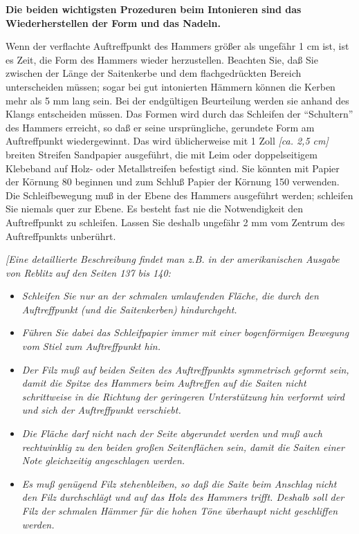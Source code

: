 \textbf{Die beiden wichtigsten Prozeduren beim Intonieren sind das Wiederherstellen der Form und das Nadeln.}

Wenn der verflachte Auftreffpunkt des Hammers größer als ungefähr 1 cm ist, ist es Zeit, die Form des Hammers wieder herzustellen.
 Beachten Sie, daß Sie zwischen der Länge der Saitenkerbe und dem flachgedrückten Bereich unterscheiden müssen; sogar bei gut intonierten Hämmern können die Kerben mehr als 5 mm lang sein.
 Bei der endgültigen Beurteilung werden sie anhand des Klangs entscheiden müssen.
 Das Formen wird durch das Schleifen der \enquote{Schultern} des Hammers erreicht, so daß er seine ursprüngliche, gerundete Form am Auftreffpunkt wiedergewinnt.
 Das wird üblicherweise mit 1 Zoll \textit{[ca. 2,5 cm]} breiten Streifen Sandpapier ausgeführt, die mit Leim oder doppelseitigem Klebeband auf Holz- oder Metallstreifen befestigt sind.
 Sie könnten mit Papier der Körnung 80 beginnen und zum Schluß Papier der Körnung 150 verwenden.
 Die Schleifbewegung muß in der Ebene des Hammers ausgeführt werden; schleifen Sie niemals quer zur Ebene.
 Es besteht fast nie die Notwendigkeit den Auftreffpunkt zu schleifen.
 Lassen Sie deshalb ungefähr 2 mm vom Zentrum des Auftreffpunkts unberührt.
 

\textit{[Eine detaillierte Beschreibung findet man z.B. in der amerikanischen Ausgabe von Reblitz auf den Seiten 137 bis 140:}
\begin{itemize}
	\item \textit{Schleifen Sie nur an der schmalen umlaufenden Fläche, die durch den Auftreffpunkt (und die Saitenkerben) hindurchgeht.}
	\item \textit{Führen Sie dabei das Schleifpapier immer mit einer bogenförmigen Bewegung vom Stiel zum Auftreffpunkt hin.}
	\item \textit{Der Filz muß auf beiden Seiten des Auftreffpunkts symmetrisch geformt sein, damit die Spitze des Hammers beim Auftreffen auf die Saiten nicht schrittweise in die Richtung der geringeren Unterstützung hin verformt wird und sich der Auftreffpunkt verschiebt.}
	\item \textit{Die Fläche darf nicht nach der Seite abgerundet werden und muß auch rechtwinklig zu den beiden großen Seitenflächen sein, damit die Saiten einer Note gleichzeitig angeschlagen werden.}
	\item \textit{Es muß genügend Filz stehenbleiben, so daß die Saite beim Anschlag nicht den Filz durchschlägt und auf das Holz des Hammers trifft.
 Deshalb soll der Filz der schmalen Hämmer für die hohen Töne überhaupt nicht geschliffen werden.}
\end{itemize}

